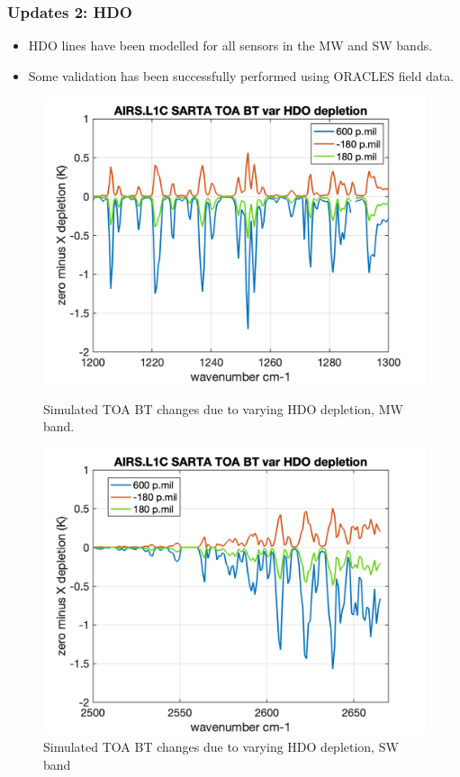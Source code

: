 \documentclass[10pt,t]{beamer}
\begin{document}
\begin{frame}
  \frametitle{Updates 2: HDO}
  \begin{itemize}
    \item HDO lines have been modelled for all sensors in the MW and SW bands.
    \item Some validation has been successfully performed using ORACLES field data.
  \end{itemize}

\begin{figure}
\begin{minipage}[c]{0.45\linewidth}
  \includegraphics[width=\linewidth]{./Figs/airs_l1c_hdo_r49_mw_var_depletion.png}
  \caption{Simulated TOA BT changes due to varying HDO depletion, MW band.}
\end{minipage}
\hfill
\begin{minipage}[c]{0.45\linewidth}
  \includegraphics[width=\linewidth]{./Figs/airs_l1c_hdo_r49_sw_var_depletion.png}
  \caption{Simulated TOA BT changes due to varying HDO depletion, SW band}
\end{minipage}%
\end{figure}


\end{frame}
\end{document}
